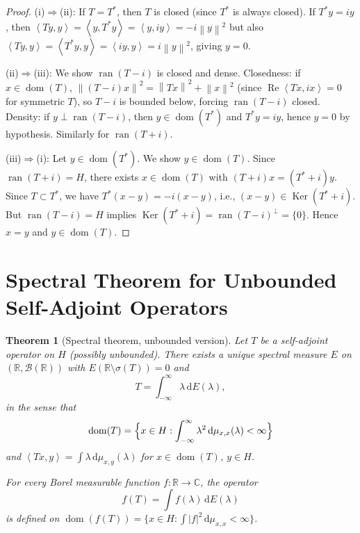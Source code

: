 \documentclass[a4paper,12pt]{book}
\DeclareMathOperator{\Ker}{Ker}
\DeclareMathOperator{\dom}{dom}
\DeclareMathOperator{\ran}{ran}
\newcommand{\R}{\mathbb{R}}
\newcommand{\C}{\mathbb{C}}
\newcommand{\dd}{\mathrm{d}}
\newcommand{\norm}[1]{\left\| #1 \right\|}
\newcommand{\abs}[1]{\left| #1 \right|}
\newcommand{\inner}[2]{\left\langle #1, #2 \right\rangle}
\theoremstyle{definition}
\theoremstyle{plain}
\newtheorem{theorem}[definition]{Theorem}
\theoremstyle{remark}
\begin{document}
\begin{proof}
(i)$\Rightarrow$(ii): If $T = T^*$, then $T$ is closed (since $T^*$ is always
closed). If $T^* y = iy$, then $\inner{Ty}{y} = \inner{y}{T^*y} = \inner{y}{iy} = -i\norm{y}^2$
but also $\inner{Ty}{y} = \inner{T^*y}{y} = \inner{iy}{y} = i\norm{y}^2$, giving
$y = 0$.

(ii)$\Rightarrow$(iii): We show $\ran(T - i)$ is closed and dense. Closedness:
if $x \in \dom(T)$, $\norm{(T - i)x}^2 = \norm{Tx}^2 + \norm{x}^2$ (since
$\operatorname{Re}\inner{Tx}{ix} = 0$ for symmetric $T$), so $T - i$ is bounded
below, forcing $\ran(T - i)$ closed. Density: if $y \perp \ran(T - i)$, then
$y \in \dom(T^*)$ and $T^*y = iy$, hence $y = 0$ by hypothesis. Similarly for
$\ran(T + i)$.

(iii)$\Rightarrow$(i): Let $y \in \dom(T^*)$. We show $y \in \dom(T)$.
Since $\ran(T + i) = H$, there exists $x \in \dom(T)$ with
$(T + i)x = (T^* + i)y$. Since $T \subset T^*$, we have
$T^*(x - y) = -i(x - y)$, i.e., $(x - y) \in \Ker(T^* + i)$.
But $\ran(T - i) = H$ implies $\Ker(T^* + i) = \ran(T - i)^\perp = \{0\}$.
Hence $x = y$ and $y \in \dom(T)$.
\end{proof}

\section{Spectral Theorem for Unbounded Self-Adjoint Operators}
\label{sec:spectral-unbounded}


\begin{theorem}[Spectral theorem, unbounded version]\label{thm:spectral-unbounded}
Let $T$ be a self-adjoint operator on $H$ (possibly unbounded). There exists a
unique spectral measure $E$ on $(\R, \mathcal{B}(\R))$ with
$E(\R \setminus \sigma(T)) = 0$ and
\[
  T = \int_{-\infty}^{\infty} \lambda\, \dd E(\lambda),
\]
in the sense that
\[
  \dom(T) = \Bigl\{x \in H : \int_{-\infty}^{\infty} \lambda^2\, \dd\mu_{x,x}(\lambda)
  < \infty\Bigr\}
\]
and $\inner{Tx}{y} = \int \lambda\, \dd\mu_{x,y}(\lambda)$ for $x \in \dom(T)$,
$y \in H$.

For every Borel measurable function $f \colon \R \to \C$, the operator
\[
  f(T) = \int f(\lambda)\, \dd E(\lambda)
\]
is defined on $\dom(f(T)) = \{x \in H : \int \abs{f}^2\, \dd\mu_{x,x} < \infty\}$.
\end{theorem}
\end{document}
